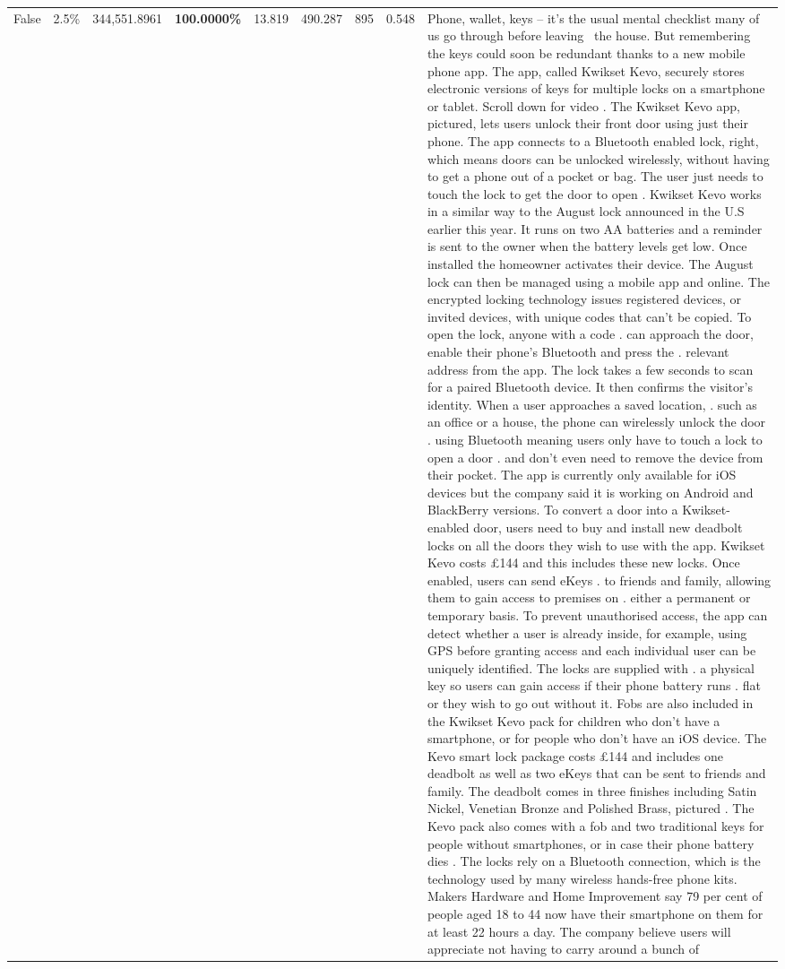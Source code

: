 \begin{table}[H]
\begin{tabular}{lllrlllll}
False & 2.5\% & 344,551.8961 & \bfseries \color{red} 100.0000\% & 13.819 & 490.287 & 895 & 0.548 & Phone, wallet, keys – it’s the usual mental checklist many of us go through before leaving  the house. But remembering the keys could soon be redundant thanks to a new mobile phone app. The app, called Kwikset Kevo, securely stores electronic versions of keys for multiple locks on a smartphone or tablet. Scroll down for video . The Kwikset Kevo app, pictured, lets users unlock their front door using just their phone. The app connects to a Bluetooth enabled lock, right, which means doors can be unlocked wirelessly, without having to get a phone out of a pocket or bag. The user just needs to touch the lock to get the door to open . Kwikset Kevo works in a similar way to the August lock announced in the U.S earlier this year. It runs on two AA batteries and a reminder is sent to the owner when the battery levels get low. Once installed the homeowner activates their device. The August lock can then be managed using a mobile app and online. The encrypted locking technology issues registered devices, or invited devices, with unique codes that can't be copied. To open the lock, anyone with a code . can approach the door, enable their phone's Bluetooth and press the . relevant address from the app. The lock takes a few seconds to scan for a paired Bluetooth device. It then confirms the visitor's identity. When a user approaches a saved location, . such as an office or a house, the phone can wirelessly unlock the door . using Bluetooth meaning users only have to touch a lock to open a door . and don't even need to remove the device from their pocket. The app is currently only available for iOS devices but the company said it is working on Android and BlackBerry versions. To convert a door into a Kwikset-enabled door, users need to buy and install new deadbolt locks on all the doors they wish to use with the app. Kwikset Kevo costs £144 and this includes these new locks. Once enabled, users can send eKeys . to friends and family, allowing them to gain access to premises on . either a permanent or temporary basis. To prevent unauthorised access, the app can detect whether a user is already inside, for example, using GPS before granting access and each individual user can be uniquely identified. The locks are supplied with . a physical key so users can gain access if their phone battery runs . flat or they wish to go out without it. Fobs are also included in the Kwikset Kevo pack for children who don't have a smartphone, or for people who don't have an iOS device. The Kevo smart lock package costs £144 and includes one deadbolt as well as two eKeys that can be sent to friends and family. The deadbolt comes in three finishes including Satin Nickel, Venetian Bronze and Polished Brass, pictured . The Kevo pack also comes with a fob and two traditional keys for people without smartphones, or in case their phone battery dies . The locks rely on a Bluetooth connection, which is the technology used by many wireless hands-free phone kits. Makers Hardware and Home Improvement say 79 per cent of people aged 18 to 44 now have their smartphone on them for at least 22 hours a day. The company believe users will appreciate not having to carry around a bunch of 
\end{tabular}
\end{table}
